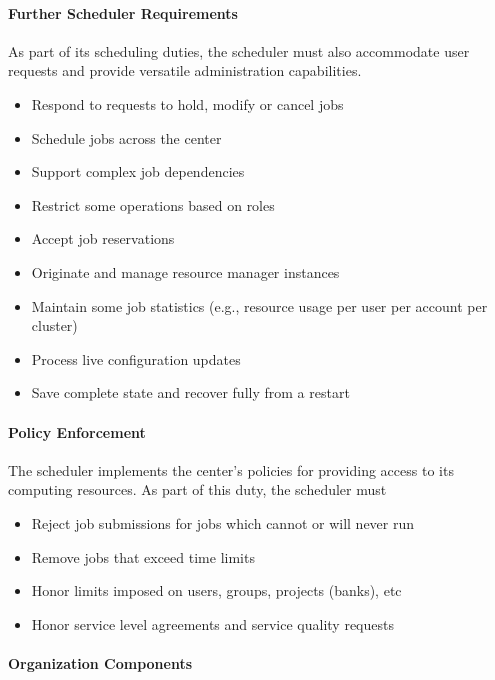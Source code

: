 \paragraph{Further Scheduler Requirements}

As part of its scheduling duties, the scheduler must also accommodate
user requests and provide versatile administration capabilities.

\begin{itemize}
  \item Respond to requests to hold, modify or cancel jobs
  \item Schedule jobs across the center
  \item Support complex job dependencies
  \item Restrict some operations based on roles
  \item Accept job reservations
  \item Originate and manage resource manager instances
  \item Maintain some job statistics (e.g., resource usage per user
    per account per cluster)
  \item Process live configuration updates
  \item Save complete state and recover fully from a restart
\end{itemize}

\paragraph{Policy Enforcement}

The scheduler implements the center's policies for providing access to
its computing resources.  As part of this duty, the scheduler must

\begin{itemize}
  \item Reject job submissions for jobs which cannot or will never run
  \item Remove jobs that exceed time limits
  \item Honor limits imposed on users, groups, projects (banks), etc
  \item Honor service level agreements and service quality requests
\end{itemize}

\paragraph{Organization Components}

